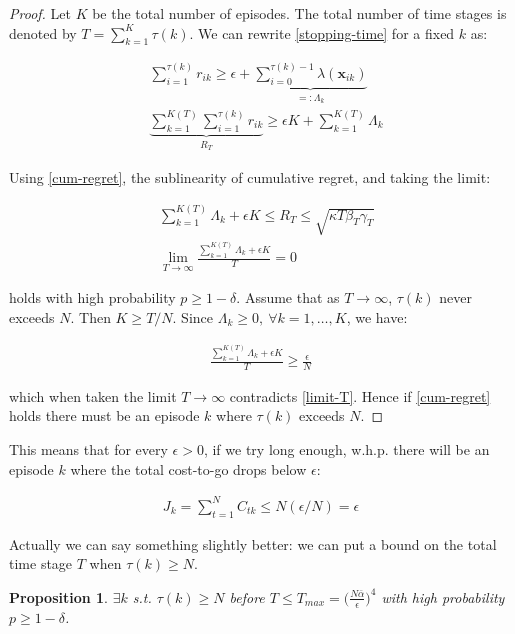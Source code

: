 \documentclass[10pt,a4paper]{article}
\newcommand{\state}{\mathbf{x}} %
\newtheorem{prop}{Proposition}[section]
\begin{document}
\begin{proof}
Let $K$ be the total number of episodes. The total number of time stages is denoted by $T = \sum_{k=1}^{K} \tau(k)$. We can rewrite \eqref{stopping-time} for a fixed $k$ as:

\begin{align}
&\sum_{i=1}^{\tau(k)} r_{ik} \geq \epsilon + \underbrace{\sum_{i=0}^{\tau(k)-1} \lambda(\state_{ik})}_{=: \Lambda_k} \\
&\underbrace{\sum_{k=1}^{K(T)}\sum_{i=1}^{\tau(k)} r_{ik}}_{R_{T}} \geq \epsilon K + \sum_{k=1}^{K(T)}\Lambda_k
\end{align}

Using \eqref{cum-regret}, the sublinearity of cumulative regret, and taking the limit:

\begin{align}
&\sum_{k=1}^{K(T)}\Lambda_k + \epsilon K \leq R_{T} \leq \sqrt{\kappa T \beta_{T} \gamma_{T}} \label{pre-limit-T} \\
&\lim\limits_{T \to \infty} \frac{\sum_{k=1}^{K(T)}\Lambda_k + \epsilon K}{T} = 0 \label{limit-T}
\end{align}

holds with high probability $p \geq 1 - \delta$. Assume that as $T \to \infty$, $\tau(k)$ never exceeds $N$. Then $K \geq T/N$. Since $\Lambda_k \geq 0, \ \forall k = 1,\ldots,K$, we have:

\begin{align}
\frac{\sum_{k=1}^{K(T)}\Lambda_k + \epsilon K}{T} \geq \frac{\epsilon}{N}
\end{align}

which when taken the limit $T \to \infty$ contradicts \eqref{limit-T}. Hence if \eqref{cum-regret} holds there must be an episode $k$ where $\tau(k)$  exceeds $N$.

\end{proof}

This means that for every $\epsilon > 0$, if we try long enough, w.h.p. there will be an episode $k$ where the total cost-to-go drops below $\epsilon$:

\begin{align}
J_k = \sum_{t=1}^{N} C_{tk} \leq N(\epsilon/N) = \epsilon
\end{align}

Actually we can say something slightly better: we can put a bound on the total time stage $T$ when $\tau(k) \geq N$.

\begin{prop} \label{trj-tracking-conv-2}
$\exists k$ s.t. $\tau(k) \geq N$ before $T \leq T_{max} = \big(\frac{N\bar{\alpha}}{\epsilon}\big)^{4}$ with high probability $p \geq 1 - \delta$.
\end{prop}
\end{document}
